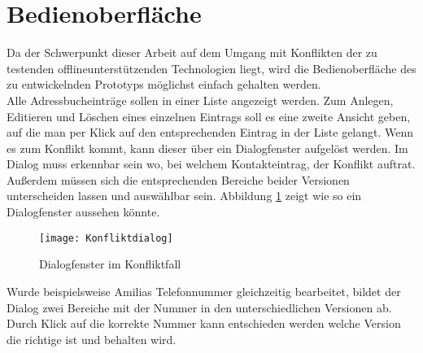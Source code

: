 \section{Bedienoberfläche}
Da der Schwerpunkt dieser Arbeit auf dem Umgang mit Konflikten der zu testenden offlineunterstützenden Technologien liegt, wird die Bedienoberfläche des zu entwickelnden Prototyps  möglichst einfach gehalten werden.\\
Alle Adressbucheinträge sollen in einer Liste angezeigt werden. Zum Anlegen, Editieren und Löschen eines einzelnen Eintrags soll es eine zweite Ansicht geben, auf die man per Klick auf den entsprechenden Eintrag in der Liste gelangt.
Wenn es zum Konflikt kommt, kann dieser über ein Dialogfenster aufgelöst werden. Im Dialog muss erkennbar sein wo, bei welchem Kontakteintrag, der Konflikt auftrat. Außerdem müssen sich die entsprechenden Bereiche beider Versionen unterscheiden lassen und auswählbar sein. Abbildung \ref{fig:dialog} zeigt wie so ein Dialogfenster aussehen könnte.
\begin{figure}[H]
    \centering
    \texttt{[image: Konfliktdialog]}
    \grayRule
    \caption{Dialogfenster im Konfliktfall}
    \label{fig:dialog}
\end{figure}
Wurde beispielsweise Amilias Telefonnummer gleichzeitig bearbeitet, bildet der Dialog zwei Bereiche mit der Nummer in den unterschiedlichen Versionen ab. Durch Klick auf die korrekte Nummer kann entschieden werden welche Version die richtige ist und behalten wird.